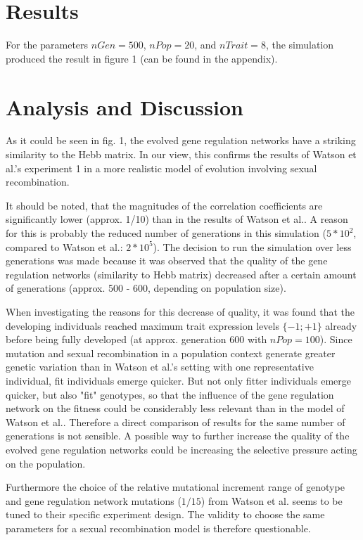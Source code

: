 \documentclass{article}
\begin{document}
\section{Results}

For the parameters $nGen = 500$, $nPop = 20$, and $nTrait = 8$, the simulation produced the result in figure 1 (can be found in the appendix).


\section{Analysis and Discussion}

As it could be seen in fig. 1, the evolved gene regulation networks have a striking similarity to the Hebb matrix. In our view, this confirms the results of Watson et al.'s experiment 1 in a more realistic model of evolution involving sexual recombination.

It should be noted, that the magnitudes of the correlation coefficients are significantly lower (approx. 1/10) than in the results of Watson et al..
A reason for this is probably the reduced number of generations in this simulation ($5*10^2$, compared to Watson et al.: $2*10^5$).
The decision to run the simulation over less generations was made because it was observed that the quality of the gene regulation networks (similarity to Hebb matrix) decreased after a certain amount of generations (approx. 500 - 600, depending on population size).

When investigating the reasons for this decrease of quality, it was found that the developing individuals reached maximum trait expression levels $\{-1; +1\}$ already before being fully developed (at approx. generation 600 with $nPop = 100$).
Since mutation and sexual recombination in a population context generate greater genetic variation than in Watson et al.'s setting with one representative individual, fit individuals emerge quicker.
But not only fitter individuals emerge quicker, but also "fit" genotypes, so that the influence of the gene regulation network on the fitness could be considerably less relevant than in the model of Watson et al..
Therefore a direct comparison of results for the same number of generations is not sensible.
A possible way to further increase the quality of the evolved gene regulation networks could be increasing the selective pressure acting on the population.
\newline

Furthermore the choice of the relative mutational increment range of genotype and gene regulation network mutations ($1/15$) from Watson et al. seems to be tuned to their specific experiment design. The validity to choose the same parameters for a sexual recombination model is therefore questionable.
\end{document}
